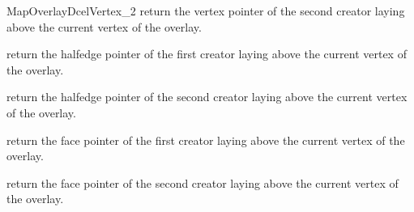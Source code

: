 \begin{ccRefConcept}{MapOverlayDcelVertex_2}
  {return the vertex pointer of the second creator laying above the current vertex of the overlay.}
  
  {return the halfedge pointer of the first creator laying above the current vertex of the overlay.}

  {return the halfedge pointer of the second creator laying above the current vertex of the overlay.}

  {return the face pointer of the first creator laying above the current vertex of the overlay.}

  {return the face pointer of the second creator laying above the current vertex of the overlay.}
  
\end{ccRefConcept} %

\ccRefPageEnd
